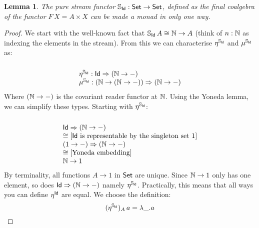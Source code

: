 \documentclass{article}
\newtheorem{lemma}[definition]{Lemma}
\begin{document}
\begin{lemma}\label{lemma:stream_monad}
The pure stream functor $\mathbb{S}_{\mathsf{Id}}: \mathsf{Set} \to \mathsf{Set}$, defined as the final coalgebra of the functor $F\,X = A \times X$ can be made a monad in only one way.
\end{lemma}
\begin{proof}
We start with the well-known fact that $\mathbb{S}_{\mathsf{Id}}\,A \cong \mathbb{N} \rightarrow A$ (think of $n :\mathbb{N}$ as indexing the elements in the stream). From this we can characterise $\eta^{\mathbb{S}_{\mathsf{Id}}}$ and $\mu^{\mathbb{S}_{\mathsf{Id}}}$ as:
$$
\begin{array}{ll} \ \\
\eta^{\mathbb{S}_{\mathsf{Id}}} : \mathsf{Id} \Rightarrow (\mathbb{N} \to -) \\
\mu^{\mathbb{S}_{\mathsf{Id}}} : (\mathbb{N} \to (\mathbb{N} \to -)) \Rightarrow (\mathbb{N} \to -)
\end{array}
$$
Where $(\mathbb{N} \to -)$ is the covariant reader functor at $\mathbb{N}$. Using the Yoneda lemma, we can simplify these types. Starting with $\eta^{\mathbb{S}_{\mathsf{Id}}}$:
$$
\begin{array}{ll} \ \\
\mathsf{Id} \Rightarrow (\mathbb{N} \to -) \\
\cong \text{[$\mathsf{Id}$ is representable by the singleton set $1$]} \\
(1 \to -) \Rightarrow (\mathbb{N} \to -) \\
\cong \text{[Yoneda embedding]} \\
\mathbb{N} \to 1
\end{array}
$$
By terminality, all functions $A \to 1$ in $\mathsf{Set}$ are unique. Since $\mathbb{N} \to 1$ only has one element, so does $\mathsf{Id} \Rightarrow (\mathbb{N} \to -)$ namely $\eta^{\mathbb{S}_{\mathsf{Id}}}$. Practically, this means that all ways you can define $\eta^{\mathsf{Id}}$ are equal. We choose the definition:
$$
(\eta^{\mathbb{S}_{\mathsf{Id}}})_A\, a = \lambda \_ . a
$$


\end{proof}
\end{document}
